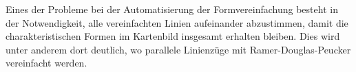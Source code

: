 \documentclass[../main/thesis.tex]{subfiles}
\begin{document}

Eines der Probleme bei der Automatisierung der Formvereinfachung besteht in der Notwendigkeit, alle vereinfachten Linien aufeinander abzustimmen, damit die charakteristischen Formen im Kartenbild insgesamt erhalten bleiben. 
Dies wird unter anderem dort deutlich, wo parallele Linienzüge mit Ramer-Douglas-Peucker vereinfacht werden.
\end{document}
